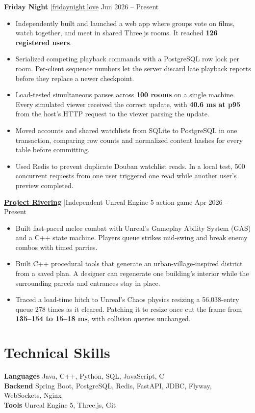 \documentclass[letterpaper,11pt]{article}
\begin{document}
\par\addvspace{6pt}
\textbf{Friday Night} \enspace|\enspace \href{https://fridaynight.love}{fridaynight.love} \hfill Jun 2026 -- Present
\begin{itemize}
\item Independently built and launched a web app where groups vote on films, watch together, and meet in shared Three.js rooms. It reached \textbf{126 registered users}.
\item Serialized competing playback commands with a PostgreSQL row lock per room. Per-client sequence numbers let the server discard late playback reports before they replace a newer checkpoint.
\item Load-tested simultaneous pauses across \textbf{100 rooms} on a single machine. Every simulated viewer received the correct update, with \textbf{40.6 ms at p95} from the host's HTTP request to the viewer parsing the update.
\item Moved accounts and shared watchlists from SQLite to PostgreSQL in one transaction, comparing row counts and normalized content hashes for every table before committing.
\item Used Redis to prevent duplicate Douban watchlist reads. In a local test, 500 concurrent requests from one user triggered one read while another user's preview completed.
\end{itemize}

\par\addvspace{6pt}
\href{https://gyoichii.github.io/projects/rivering/}{\textbf{Project Rivering}} \enspace|\enspace Independent Unreal Engine 5 action game \hfill Apr 2026 -- Present
\begin{itemize}
\item Built fast-paced melee combat with Unreal's Gameplay Ability System (GAS) and a C++ state machine. Players queue strikes mid-swing and break enemy combos with timed parries.
\item Built C++ procedural tools that generate an urban-village-inspired district from a saved plan. A designer can regenerate one building's interior while the surrounding parcels and entrances stay in place.
\item Traced a load-time hitch to Unreal's Chaos physics resizing a 56,038-entry queue 278 times as it cleared. Patching it to resize once cut the frame from \textbf{135--154 to 15--18 ms}, with collision queries unchanged.
\end{itemize}

\section*{Technical Skills}
\textbf{Languages} \enspace Java, C++, Python, SQL, JavaScript, C\\
\textbf{Backend} \enspace Spring Boot, PostgreSQL, Redis, FastAPI, JDBC, Flyway, WebSockets, Nginx\\
\textbf{Tools} \enspace Unreal Engine 5, Three.js, Git
\end{document}

